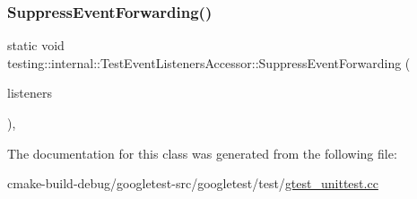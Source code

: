 \subsubsection{\texorpdfstring{SuppressEventForwarding()}{SuppressEventForwarding()}}
{\footnotesize\ttfamily static void testing\+::internal\+::\+Test\+Event\+Listeners\+Accessor\+::\+Suppress\+Event\+Forwarding (\begin{DoxyParamCaption}\item[{\mbox{\hyperlink{classtesting_1_1TestEventListeners}{Test\+Event\+Listeners}} $\ast$}]{listeners }\end{DoxyParamCaption})\hspace{0.3cm}{\ttfamily [inline]}, {\ttfamily [static]}}



The documentation for this class was generated from the following file\+:\begin{DoxyCompactItemize}
\item 
cmake-\/build-\/debug/googletest-\/src/googletest/test/\mbox{\hyperlink{gtest__unittest_8cc}{gtest\+\_\+unittest.\+cc}}\end{DoxyCompactItemize}
